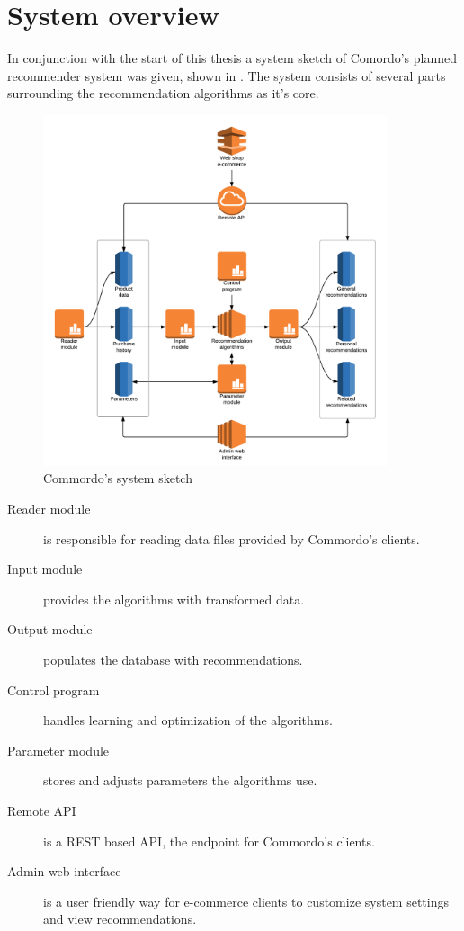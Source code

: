 
\section{System overview}\label{sec:sysoverview}

In conjunction with the start of this thesis a system sketch of Comordo's planned recommender system was given, shown in . The system consists of several parts surrounding the recommendation algorithms as it's core.

\vspace{-0.3cm}
\begin{figure}[h!]
  \centering
    \includegraphics[width=0.9\textwidth]{fig/system_overview.png}
  \caption{Commordo's system sketch}
  \label{fig:sysoverview}
\end{figure}

\FloatBarrier

\begin{description}
    \item[Reader module] is responsible for reading data files provided by Commordo's clients.
    \item[Input module] provides the algorithms with transformed data.
    \item[Output module] populates the database with recommendations.
    \item[Control program] handles learning and optimization of the algorithms.
    \item[Parameter module] stores and adjusts parameters the algorithms use.
    \item[Remote API] is a REST based API, the endpoint for Commordo's clients.
    \item[Admin web interface] is a user friendly way for e-commerce clients to customize system settings and view recommendations.
\end{description}

